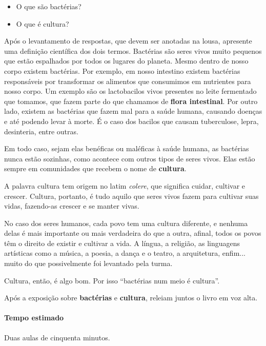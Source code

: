\documentclass[11pt]{extarticle}
\begin{document}
\begin{itemize}
\item O que são bactérias?
\item O que é cultura?
\end{itemize}

Após o levantamento de respostas, que devem ser anotadas na lousa,
apresente uma definição científica dos dois termos.
Bactérias são seres vivos muito pequenos que estão espalhados
por todos os lugares do planeta. 
Mesmo dentro de nosso corpo existem
bactérias. Por exemplo, em nosso intestino existem bactérias
responsáveis por transformar os alimentos que consumimos
em nutrientes para nosso corpo. Um exemplo são os lactobacilos vivos presentes
no leite fermentado que tomamos, que fazem parte do que chamamos de \textbf{flora intestinal}.
Por outro lado, existem as bactérias que fazem mal para a saúde humana,
causando doenças e até podendo levar à morte. É o caso dos bacilos 
que causam tuberculose, lepra, desinteria, entre outras. 

Em todo caso, sejam elas benéficas ou maléficas à saúde humana, 
as bactérias nunca estão sozinhas, como acontece com outros tipos
de seres vivos. Elas estão sempre em comunidades que recebem o
nome de \textbf{cultura}.


A palavra cultura tem origem no latim \textit{colere}, que significa 
cuidar, cultivar e crescer. Cultura, portanto, é tudo
aquilo que seres vivos fazem para cultivar suas vidas,
fazendo-as crescer e se manter vivas. 

No caso dos seres humanos, cada povo tem uma cultura diferente,
e nenhuma delas é mais importante ou mais verdadeira do que a outra,
afinal, todos os povos têm o direito de existir e cultivar a vida. 
A língua, a religião, as linguagens artísticas como a música,
a poesia, a dança e o teatro, a arquitetura, enfim... muito 
do que possivelmente foi levantado pela turma. 

Cultura, então, é algo bom. Por isso ``bactérias num meio é cultura''.

Após a exposição sobre \textbf{bactérias} e \textbf{cultura},
releiam juntos o livro em voz alta. 

\paragraph{Tempo estimado} Duas aulas de cinquenta minutos.
\end{document}
